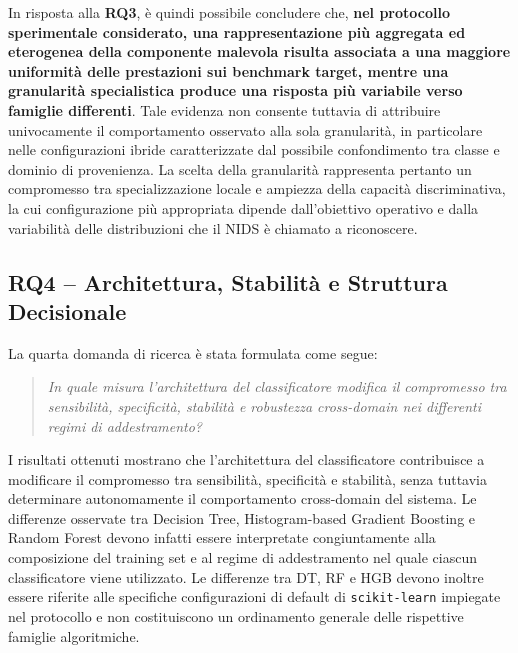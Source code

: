 In risposta alla \textbf{RQ3}, è quindi possibile concludere che, \textbf{nel protocollo sperimentale considerato, una rappresentazione più aggregata ed eterogenea della componente malevola risulta associata a una maggiore uniformità delle prestazioni sui benchmark target, mentre una granularità specialistica produce una risposta più variabile verso famiglie differenti}. Tale evidenza non consente tuttavia di attribuire univocamente il comportamento osservato alla sola granularità, in particolare nelle configurazioni ibride caratterizzate dal possibile confondimento tra classe e dominio di provenienza.
La scelta della granularità rappresenta pertanto un compromesso tra specializzazione locale e ampiezza della capacità discriminativa, la cui configurazione più appropriata dipende dall'obiettivo operativo e dalla variabilità delle distribuzioni che il NIDS è chiamato a riconoscere.



\subsection{RQ4 -- Architettura, Stabilità e Struttura Decisionale}
\label{subsec:conclusioni_rq4}

La quarta domanda di ricerca è stata formulata come segue:

\begin{quote}
\textit{In quale misura l'architettura del classificatore modifica il compromesso tra sensibilità, specificità, stabilità e robustezza cross-domain nei differenti regimi di addestramento?}
\end{quote}

I risultati ottenuti mostrano che l'architettura del classificatore contribuisce a modificare il compromesso tra sensibilità, specificità e stabilità, senza tuttavia determinare autonomamente il comportamento cross-domain del sistema.
Le differenze osservate tra Decision Tree, Histogram-based Gradient Boosting e Random Forest devono infatti essere interpretate congiuntamente alla composizione del training set e al regime di addestramento nel quale ciascun classificatore viene utilizzato.
Le differenze tra DT, RF e HGB devono inoltre essere riferite alle specifiche configurazioni di default di \texttt{scikit-learn} impiegate nel protocollo e non costituiscono un ordinamento generale delle rispettive famiglie algoritmiche.


